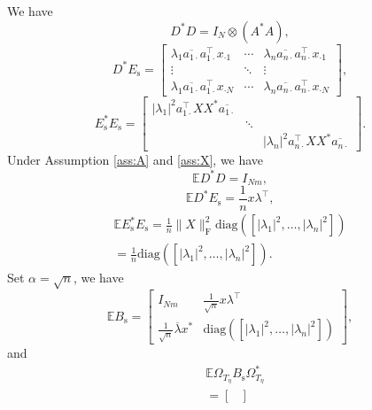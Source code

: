 \documentclass[11pt,journal]{IEEEtran}
\newcommand{\bbE}{\mathbb{E}}
\newcommand{\rmF}{\mathrm{F}}
\newcommand{\rms}{\mathrm{s}}
\newcommand{\norm}[1]{\|{#1}\|}
\newcommand{\T}{\top}
\newcommand{\diag}{\mathrm{diag}}
\begin{document}
\begin{IEEEproof}
We have
\begin{equation}
\label{eq:DstarD}
D^*D = I_N\otimes (A^*A),
\end{equation}
\begin{equation}
\label{eq:DstarEs}
D^*E_\rms = \begin{bmatrix}
\lambda_1 \overline{a_{1\cdot}} a_{1\cdot}^\T x_{\cdot 1} & \cdots & \lambda_n \overline{a_{n\cdot}} a_{n\cdot}^\T x_{\cdot 1} \\
\vdots & \ddots & \vdots \\
\lambda_1 \overline{a_{1\cdot}} a_{1\cdot}^\T x_{\cdot N} & \cdots & \lambda_n \overline{a_{n\cdot}} a_{n\cdot}^\T x_{\cdot N}
\end{bmatrix},
\end{equation}
\begin{equation}
\label{eq:EsstarEs}
E_\rms^*E_\rms = \begin{bmatrix}
|\lambda_1|^2 a_{1\cdot}^\T XX^* \overline{a_{1\cdot}} & & \\
& \ddots & \\
& & |\lambda_n|^2 a_{n\cdot}^\T XX^* \overline{a_{n\cdot}}
\end{bmatrix}.
\end{equation}
Under Assumption \ref{ass:A} and \ref{ass:X}, we have
\begin{equation}
\label{eq:EDstarD}
\bbE D^*D = I_{Nm},
\end{equation}
\begin{equation}
\label{eq:EDstarEs}
\bbE D^*E_\rms = \frac{1}{n} x \lambda^\T,
\end{equation}
\begin{align}
\bbE E_\rms^*E_\rms = \frac{1}{n}\norm{X}_\rmF^2 \diag([|\lambda_1|^2, \dots, |\lambda_n|^2]) \nonumber \\
= \frac{1}{n} \diag([|\lambda_1|^2, \dots, |\lambda_n|^2]). \label{eq:EEsstarEs}
\end{align}
Set $\alpha = \sqrt{n}$, we have
\[
\bbE B_\rms = \begin{bmatrix}
I_{Nm} & \frac{1}{\sqrt{n}} x \lambda^\T \\
\frac{1}{\sqrt{n}}  \overline{\lambda}x^*  & \diag([|\lambda_1|^2, \dots, |\lambda_n|^2])
\end{bmatrix},
\]
and
\begin{align*}
& \bbE \Omega_{T_\eta} B_\rms \Omega_{T_\eta}^* \\
& = \begin{bmatrix}

\end{bmatrix}
\end{align*}
\end{IEEEproof}
\end{document}
